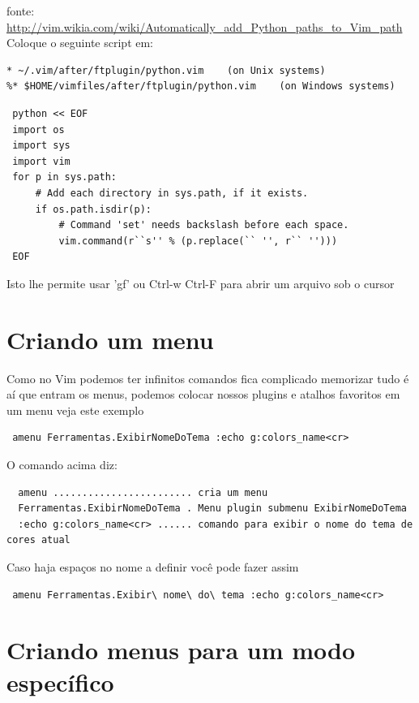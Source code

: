 \documentclass[10pt,a4paper,openany]{book}
\begin{document}
fonte:
\url{http://vim.wikia.com/wiki/Automatically_add_Python_paths_to_Vim_path}
Coloque o seguinte script em:

\begin{verbatim}
* ~/.vim/after/ftplugin/python.vim    (on Unix systems)
%* $HOME/vimfiles/after/ftplugin/python.vim    (on Windows systems)
\end{verbatim}

\begin{verbatim}
 python << EOF
 import os
 import sys
 import vim
 for p in sys.path:
     # Add each directory in sys.path, if it exists.
     if os.path.isdir(p):
         # Command 'set' needs backslash before each space.
         vim.command(r``s'' % (p.replace(`` '', r`` '')))
 EOF
\end{verbatim}

Isto lhe permite usar 'gf' ou Ctrl-w Ctrl-F para abrir um arquivo sob o cursor

\section{Criando um menu}
\label{Criando um menu}

Como no Vim podemos ter infinitos comandos fica complicado memorizar tudo
é aí que entram os menus, podemos colocar nossos plugins e atalhos favoritos
em um menu veja este exemplo

\begin{verbatim}
 amenu Ferramentas.ExibirNomeDoTema :echo g:colors_name<cr>
\end{verbatim}

O comando acima diz:

\begin{verbatim}
  amenu ........................ cria um menu
  Ferramentas.ExibirNomeDoTema . Menu plugin submenu ExibirNomeDoTema
  :echo g:colors_name<cr> ...... comando para exibir o nome do tema de cores atual
\end{verbatim}

Caso haja espaços no nome a definir você pode fazer assim

\begin{verbatim}
 amenu Ferramentas.Exibir\ nome\ do\ tema :echo g:colors_name<cr>
\end{verbatim}

\section{Criando menus para um modo específico}
\label{Criando menus para um modo específico}
\end{document}
